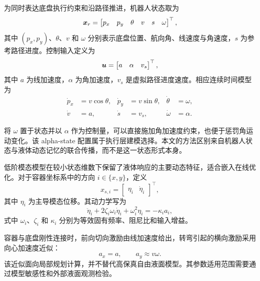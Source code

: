 为同时表达底盘执行约束和沿路径推进，机器人状态取为
\begin{equation}
  \bm{x}_{r} =
  \begin{bmatrix}
    p_x & p_y & \theta & v & s & \omega
  \end{bmatrix}^{\top},
\end{equation}
其中 $(p_x,p_y)$、$\theta$、$v$ 和 $\omega$ 分别表示底盘位置、航向角、线速度与角速度，$s$ 为参考路径进度。控制输入定义为
\begin{equation}
  \bm{u} =
  \begin{bmatrix}
    a & \alpha & v_s
  \end{bmatrix}^{\top},
\end{equation}
其中 $a$ 为线加速度，$\alpha$ 为角加速度，$v_s$ 是虚拟路径进度速度。相应连续时间模型为
\begin{equation}
\begin{aligned}
  \dot{p}_x &= v\cos\theta, &
  \dot{p}_y &= v\sin\theta, &
  \dot{\theta} &= \omega, \\
  \dot{v} &= a, &
  \dot{s} &= v_s, &
  \dot{\omega} &= \alpha .
\end{aligned}
\label{eq:robot_alpha_dynamics}
\end{equation}

将 $\omega$ 置于状态并以 $\alpha$ 作为控制量，可以直接施加角加速度约束，也便于惩罚角运动变化。该 alpha-state 配置属于执行层建模选择。本文的方法区别来自机器人状态与液体动态记忆的联合传播，而不是这一状态形式本身。

低阶模态模型在较小状态维数下保留了液体响应的主要动态特征，适合嵌入在线优化\cite{A01_Leva2021,A02_Guagliumi2021}。对于容器坐标系中的方向 $i\in\{x,y\}$，定义
\begin{equation}
  x_{s,i}=
  \begin{bmatrix}
    \eta_i & \dot{\eta}_i
  \end{bmatrix}^{\top},
\end{equation}
其中 $\eta_i$ 为主导模态位移。其动力学写为
\begin{equation}
  \ddot{\eta}_i
  +2\zeta_i\omega_i\dot{\eta}_i
  +\omega_i^2\eta_i
  =-\kappa_i a_i,
  \label{eq:slosh_modal_dynamics}
\end{equation}
式中 $\omega_i$、$\zeta_i$ 和 $\kappa_i$ 分别为等效固有频率、阻尼比和输入增益。

容器与底盘刚性连接时，前向切向激励由线加速度给出，转弯引起的横向激励采用向心加速度近似：
\begin{equation}
  a_x=a,\qquad a_y\approx v\omega .
  \label{eq:slosh_excitation}
\end{equation}
该近似面向局部规划计算，并不替代高保真自由液面模型。其参数适用范围需要通过模型敏感性和外部液面观测检验。

